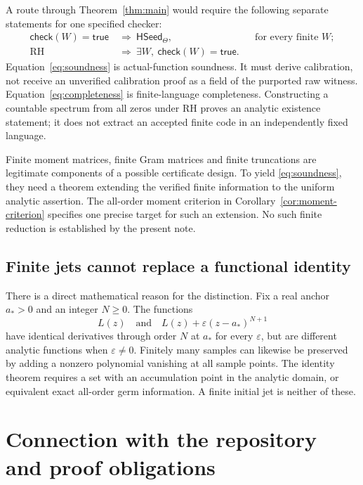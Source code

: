 \documentclass[11pt,a4paper]{article}
\numberwithin{equation}{section}
\theoremstyle{definition}
\theoremstyle{remark}
\newcommand{\RH}{\mathrm{RH}}
\newcommand{\HSeed}{\mathsf{HSeed}_{\Theta}}
\begin{document}
A route through Theorem~\ref{thm:main} would require the following
separate statements for one specified checker:
\begin{align}
\mathsf{check}(W)=\mathsf{true}&\ \Longrightarrow\ \HSeed,
&&\text{for every finite }W;\label{eq:soundness}\\
\RH&\ \Longrightarrow\ \exists W,\ \mathsf{check}(W)=\mathsf{true}.
&&\label{eq:completeness}
\end{align}
Equation~\eqref{eq:soundness} is actual-function soundness. It must
derive calibration, not receive an unverified calibration proof as a
field of the purported raw witness. Equation~\eqref{eq:completeness}
is finite-language completeness. Constructing a countable spectrum
from all zeros under RH proves an analytic existence statement; it
does not extract an accepted finite code in an independently fixed
language.

Finite moment matrices, finite Gram matrices and finite truncations
are legitimate components of a possible certificate design. To yield
\eqref{eq:soundness}, they need a theorem extending the verified finite
information to the uniform analytic assertion. The all-order moment
criterion in Corollary~\ref{cor:moment-criterion} specifies one precise
target for such an extension. No such finite reduction is established
by the present note.

\subsection{Finite jets cannot replace a functional identity}

There is a direct mathematical reason for the distinction. Fix a
real anchor $a_*>0$ and an integer $N\geq0$. The functions
\[
L(z)\quad\text{and}\quad L(z)+\varepsilon(z-a_*)^{N+1}
\]
have identical derivatives through order $N$ at $a_*$ for every
$\varepsilon$, but are different analytic functions when
$\varepsilon\ne0$. Finitely many samples can likewise be preserved by
adding a nonzero polynomial vanishing at all sample points.
The identity theorem requires a set with an accumulation point in
the analytic domain, or equivalent exact all-order germ information.
A finite initial jet is neither of these.

\section[Repository and evidence]{Connection with the repository and proof obligations}\label{sec:repository}
\end{document}
